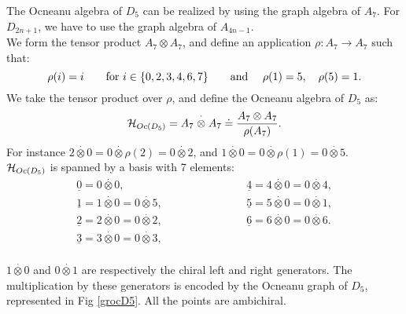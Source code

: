 \documentclass[a4paper,11pt]{article}
\def\text#1{\mbox{\rm #1\ }}
\def \otimesdot {\stackrel{\cdot}{\otimes}}
\newcommand{\ud}[1]{\underline{#1}}
\begin{document}
The Ocneanu algebra of $D_5$ can be realized by using the graph
algebra of $A_7$.
For $D_{2n+1}$, we have to use the graph algebra of $A_{4n-1}$.\\
We form the tensor product $A_7 \otimes A_7$, and define an application
$\rho: A_7 \rightarrow A_7$ such that:
$$
\rho(i) = i \qquad \text{for} i \in \{0,2,3,4,6,7 \} \qquad \text{and} \quad
\rho(1) = 5, \quad \rho(5) =1.
$$
We take the tensor product over $\rho$, and define the Ocneanu
algebra of $D_5$ as:
$$
{\cal{H}}_{Oc(D_5)}= A_7 \otimesdot A_7  \doteq \frac{A_7 \otimes
A_7}{\rho(A_7)}.
$$
For instance $2 \otimesdot 0 = 0 \otimesdot \rho (2) = 0 \otimesdot 2$, and
$1 \otimesdot 0 = 0 \otimesdot \rho (1) = 0 \otimesdot 5$.\\
${\cal{H}}_{Oc(D_5)}$ is spanned by a basis with 7 elements:
$$
\begin{array}{lcc}
\ud0 = 0 \otimesdot 0, & {} & \ud4 = 4 \otimesdot 0 = 0 \otimesdot 4, \\
\ud1 = 1 \otimesdot 0 = 0 \otimesdot 5, & \qquad \qquad \qquad & \ud5 = 5
\otimesdot 0 = 0 \otimesdot 1, \\
\ud2 = 2 \otimesdot 0 = 0 \otimesdot 2, & {} & \ud6 = 6 \otimesdot 0
= 0 \otimesdot 6. \\
\ud3 = 3 \otimesdot 0 = 0 \otimesdot 3, & {} & {} \\
\end{array}
$$

$1 \otimesdot 0$ and $0 \otimesdot 1$ are respectively the chiral
left and right
generators. The multiplication by these generators is encoded by the
Ocneanu graph
of $D_5$, represented in Fig \ref{grocD5}.
All the points are ambichiral.
\end{document}
